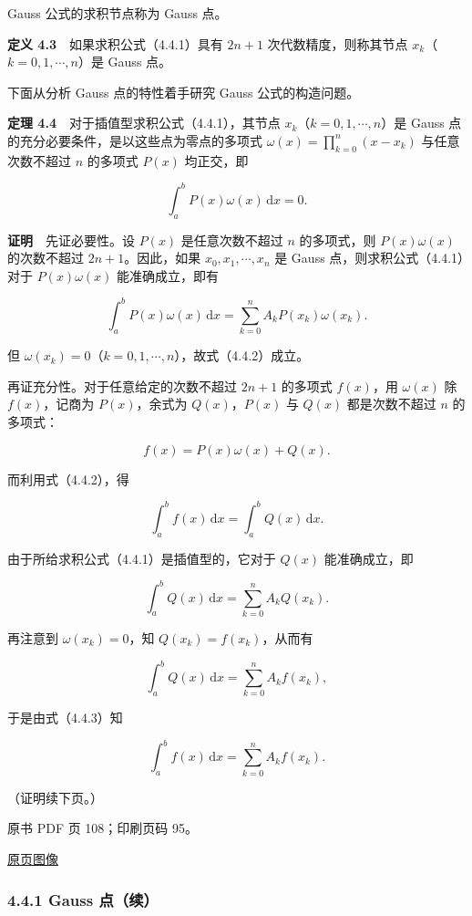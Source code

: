 Gauss 公式的求积节点称为 Gauss 点。

\textbf{定义 4.3}　如果求积公式（4.4.1）具有 \(2n+1\) 次代数精度，则称其节点 \(x_k\)（\(k=0,1,\cdots,n\)）是 Gauss 点。

下面从分析 Gauss 点的特性着手研究 Gauss 公式的构造问题。

\textbf{定理 4.4}　对于插值型求积公式（4.4.1），其节点 \(x_k\)（\(k=0,1,\cdots,n\)）是 Gauss 点的充分必要条件，是以这些点为零点的多项式 \(\displaystyle\omega(x)=\prod_{k=0}^{n}(x-x_k)\) 与任意次数不超过 \(n\) 的多项式 \(P(x)\) 均正交，即

\[
\int_a^b P(x)\omega(x)\,\mathrm{d}x=0.
\tag{4.4.2}
\]

\textbf{证明}　先证必要性。设 \(P(x)\) 是任意次数不超过 \(n\) 的多项式，则 \(P(x)\omega(x)\) 的次数不超过 \(2n+1\)。因此，如果 \(x_0,x_1,\cdots,x_n\) 是 Gauss 点，则求积公式（4.4.1）对于 \(P(x)\omega(x)\) 能准确成立，即有

\[
\int_a^b P(x)\omega(x)\,\mathrm{d}x
=\sum_{k=0}^{n}A_kP(x_k)\omega(x_k).
\]

但 \(\omega(x_k)=0\)（\(k=0,1,\cdots,n\)），故式（4.4.2）成立。

再证充分性。对于任意给定的次数不超过 \(2n+1\) 的多项式 \(f(x)\)，用 \(\omega(x)\) 除 \(f(x)\)，记商为 \(P(x)\)，余式为 \(Q(x)\)，\(P(x)\) 与 \(Q(x)\) 都是次数不超过 \(n\) 的多项式：

\[
f(x)=P(x)\omega(x)+Q(x).
\]

而利用式（4.4.2），得

\[
\int_a^b f(x)\,\mathrm{d}x=\int_a^b Q(x)\,\mathrm{d}x.
\tag{4.4.3}
\]

由于所给求积公式（4.4.1）是插值型的，它对于 \(Q(x)\) 能准确成立，即

\[
\int_a^b Q(x)\,\mathrm{d}x=\sum_{k=0}^{n}A_kQ(x_k).
\]

再注意到 \(\omega(x_k)=0\)，知 \(Q(x_k)=f(x_k)\)，从而有

\[
\int_a^b Q(x)\,\mathrm{d}x=\sum_{k=0}^{n}A_kf(x_k),
\]

于是由式（4.4.3）知

\[
\int_a^b f(x)\,\mathrm{d}x=\sum_{k=0}^{n}A_kf(x_k).
\]

（证明续下页。）

\clearpage

原书 PDF 页 108；印刷页码 95。

\href{source-images/pdf-108.jpeg}{原页图像}

\subsubsection{4.4.1 Gauss 点（续）}\label{ch04b-gauss-ux70b9ux7eed}

